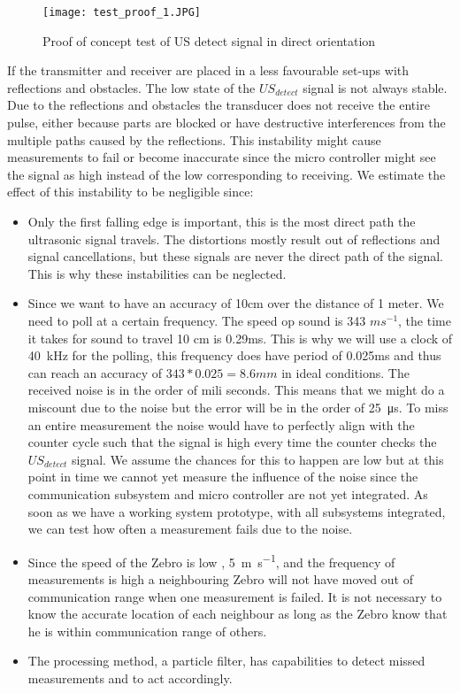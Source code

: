 \begin{figure}[H]
\centering
\texttt{[image: test\_proof\_1.JPG]}
\caption{Proof of concept test of US detect signal in direct orientation}\label{fig:proof_test_1}
\end{figure}

If the transmitter and receiver are placed in a less favourable set-ups with reflections and obstacles.
The low state of the $US_{detect}$ signal is not always stable. %
Due to the reflections and obstacles the transducer does not receive the entire pulse, either because parts are blocked or have destructive interferences from the multiple paths caused by the reflections.
This instability might cause measurements to fail or become inaccurate since the micro controller might see the signal as high instead of the low corresponding to receiving.
We estimate the effect of this instability to be negligible since:

\begin{itemize}
\item
Only the first falling edge is important, this is the most direct path the ultrasonic signal travels. The distortions mostly result out of reflections and signal cancellations, but these signals are never the direct path of the signal. This is why these instabilities can be neglected.
\item
Since we want to have an accuracy of 10cm over the distance of 1 meter. We need to poll at a certain frequency. The speed op sound is 343 $ms^{-1}$, the time it takes for sound to travel 10 cm is 0.29ms. This is why we will use a clock of \SI{40}{\kilo\hertz} for the polling, this frequency does have period of 0.025ms and thus can reach an accuracy of $343 * 0.025 = 8.6 mm$ in ideal conditions.
The received noise is in the order of mili seconds. This means that we might do a miscount due to the noise but the error will be in the order of \SI{25}{\micro\second}.
To miss an entire measurement the noise would have to perfectly align with the counter cycle such that the signal is high every time the counter checks the $US_{detect}$ signal.
We assume the chances for this to happen are low but at this point in time we cannot yet measure the influence of the noise since the communication subsystem and micro controller are not yet integrated.
As soon as we have a working system prototype, with all subsystems integrated, we can test how often a measurement fails due to the noise.
\item
Since the speed of the Zebro is low , \SI{5}{\meter\per\second}, and the frequency of measurements is high a neighbouring Zebro will not have moved out of communication range when one measurement is failed.
It is not necessary to know the accurate location of each neighbour as long as the Zebro know that he is within communication range of others.
\item
The processing method, a particle filter, has capabilities to detect missed measurements and to act accordingly. \cite{processing}
\end{itemize}

